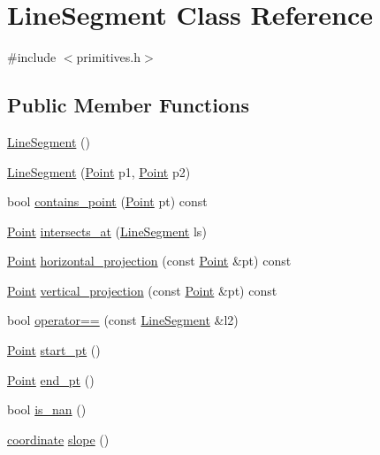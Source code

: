 \hypertarget{class_line_segment}{}\section{Line\+Segment Class Reference}
\label{class_line_segment}


{\ttfamily \#include $<$primitives.\+h$>$}

\subsection*{Public Member Functions}
\begin{DoxyCompactItemize}
\item 
\mbox{\hyperlink{class_line_segment_a4c2da2ff2d3979f28bfcb24948a8e6a9}{Line\+Segment}} ()
\item 
\mbox{\hyperlink{class_line_segment_a691e185edf3aa7e2dc12307f9ef4be6b}{Line\+Segment}} (\mbox{\hyperlink{class_point}{Point}} p1, \mbox{\hyperlink{class_point}{Point}} p2)
\item 
bool \mbox{\hyperlink{class_line_segment_a8dc46fa1dd259befff8cea92232e2a29}{contains\+\_\+point}} (\mbox{\hyperlink{class_point}{Point}} pt) const
\item 
\mbox{\hyperlink{class_point}{Point}} \mbox{\hyperlink{class_line_segment_a3bdc73ce4696a76b7c7dd143556c95b6}{intersects\+\_\+at}} (\mbox{\hyperlink{class_line_segment}{Line\+Segment}} ls)
\item 
\mbox{\hyperlink{class_point}{Point}} \mbox{\hyperlink{class_line_segment_a25c84a7d07cfd4b594a0fd7b2b37dd18}{horizontal\+\_\+projection}} (const \mbox{\hyperlink{class_point}{Point}} \&pt) const
\item 
\mbox{\hyperlink{class_point}{Point}} \mbox{\hyperlink{class_line_segment_ad057b30e155ee8a82c7aa425ba22682e}{vertical\+\_\+projection}} (const \mbox{\hyperlink{class_point}{Point}} \&pt) const
\item 
bool \mbox{\hyperlink{class_line_segment_ae73906b7230adbccf243c4b8dc6482b3}{operator==}} (const \mbox{\hyperlink{class_line_segment}{Line\+Segment}} \&l2)
\item 
\mbox{\hyperlink{class_point}{Point}} \mbox{\hyperlink{class_line_segment_a63afdd3fd0d5a3dc145109a5fe7231c6}{start\+\_\+pt}} ()
\item 
\mbox{\hyperlink{class_point}{Point}} \mbox{\hyperlink{class_line_segment_a7af4d5a73aa4f89275cda6ea2b5cfbb2}{end\+\_\+pt}} ()
\item 
bool \mbox{\hyperlink{class_line_segment_a3364f7089cf7b650efe389475ddd0f12}{is\+\_\+nan}} ()
\item 
\mbox{\hyperlink{primitives_8h_a9949b5198385a93773b854932cb22e08}{coordinate}} \mbox{\hyperlink{class_line_segment_ad13450e781bedc9ee838726cb57efabb}{slope}} ()
\end{DoxyCompactItemize}



